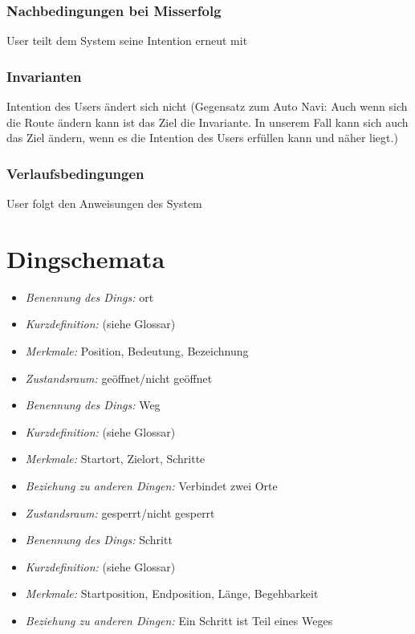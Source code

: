 \subsubsection*{Nachbedingungen bei Misserfolg} 
User teilt dem System seine Intention erneut mit 
\subsubsection*{Invarianten} 
Intention des Users ändert sich nicht (Gegensatz zum Auto Navi: Auch wenn sich die Route ändern kann ist das Ziel die Invariante. In unserem Fall kann sich auch das Ziel ändern, wenn es die Intention des Users erfüllen kann und näher liegt.) 
\subsubsection*{Verlaufsbedingungen} 
User folgt den Anweisungen des System 

\section{Dingschemata}

\begin{itemize}
\item \emph{Benennung des Dings:} \Gls{ort}
\item \emph{Kurzdefinition:} (siehe Glossar)
\item \emph{Merkmale:} Position, Bedeutung, Bezeichnung
\item \emph{Zustandsraum:} geöffnet/nicht geöffnet
\end{itemize}

\hrulefill

\begin{itemize}
\item \emph{Benennung des Dings:} Weg
\item \emph{Kurzdefinition:} (siehe Glossar)
\item \emph{Merkmale:} Startort, Zielort, Schritte
\item \emph{Beziehung zu anderen Dingen:} Verbindet zwei Orte
\item \emph{Zustandsraum:} gesperrt/nicht gesperrt
\end{itemize}

\hrulefill

\begin{itemize}
\item \emph{Benennung des Dings:} Schritt
\item \emph{Kurzdefinition:} (siehe Glossar)
\item \emph{Merkmale:} Startposition, Endposition, Länge, Begehbarkeit
\item \emph{Beziehung zu anderen Dingen:} Ein Schritt ist Teil eines Weges
\end{itemize}

